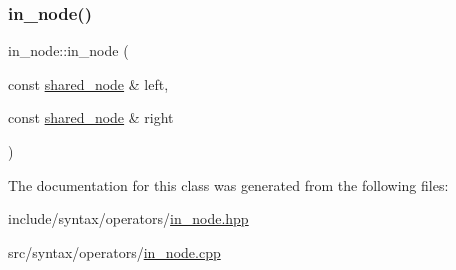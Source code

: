 \subsubsection{\texorpdfstring{in\+\_\+node()}{in\_node()}}
{\footnotesize\ttfamily in\+\_\+node\+::in\+\_\+node (\begin{DoxyParamCaption}\item[{const \hyperlink{namespacejawe_a3f307481d921b6cbb50cc8511fc2b544}{shared\+\_\+node} \&}]{left,  }\item[{const \hyperlink{namespacejawe_a3f307481d921b6cbb50cc8511fc2b544}{shared\+\_\+node} \&}]{right }\end{DoxyParamCaption})}



The documentation for this class was generated from the following files\+:\begin{DoxyCompactItemize}
\item 
include/syntax/operators/\hyperlink{in__node_8hpp}{in\+\_\+node.\+hpp}\item 
src/syntax/operators/\hyperlink{in__node_8cpp}{in\+\_\+node.\+cpp}\end{DoxyCompactItemize}
